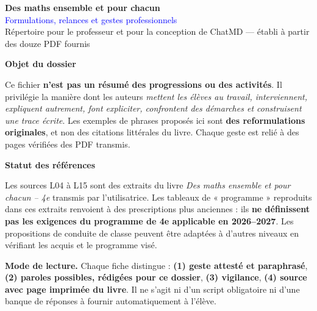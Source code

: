 \documentclass[11pt,a4paper]{article}
\newcommand{\sourcebox}[2]{\begin{tcolorbox}[colback=mist,colframe=blue,boxrule=0.35pt,arc=1mm,left=2mm,right=2mm,top=1.5mm,bottom=1.5mm]\textbf{#1}\par #2\end{tcolorbox}}
\begin{document}
\begin{center}
  {\LARGE\bfseries\textcolor{ink}{Des maths ensemble et pour chacun}}\\[5pt]
  {\Large\textcolor{blue}{Formulations, relances et gestes professionnels}}\\[4pt]
  {\small Répertoire pour le professeur et pour la conception de ChatMD --- établi à partir des douze PDF fournis}
\end{center}
\sourcebox{Objet du dossier}{Ce fichier \textbf{n'est pas un résumé des progressions ou des activités}. Il privilégie la manière dont les auteurs \emph{mettent les élèves au travail, interviennent, expliquent autrement, font expliciter, confrontent des démarches et construisent une trace écrite}. Les exemples de phrases proposés ici sont \textbf{des reformulations originales}, et non des citations littérales du livre. Chaque geste est relié à des pages vérifiées des PDF transmis.}
\sourcebox{Statut des références}{Les sources L04 à L15 sont des extraits du livre \emph{Des maths ensemble et pour chacun -- 4e} transmis par l'utilisatrice. Les tableaux de « programme » reproduits dans ces extraits renvoient à des prescriptions plus anciennes : ils \textbf{ne définissent pas les exigences du programme de 4e applicable en 2026--2027}. Les propositions de conduite de classe peuvent être adaptées à d'autres niveaux en vérifiant les acquis et le programme visé.}
\textbf{Mode de lecture.} Chaque fiche distingue : \textbf{(1) geste attesté et paraphrasé}, \textbf{(2) paroles possibles, rédigées pour ce dossier}, \textbf{(3) vigilance}, \textbf{(4) source avec page imprimée du livre}. Il ne s'agit ni d'un script obligatoire ni d'une banque de réponses à fournir automatiquement à l'élève.
\tableofcontents
\newpage
\end{document}
